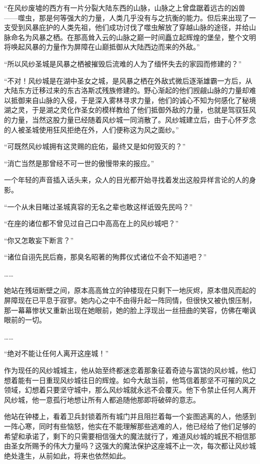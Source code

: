 \clearpage
{}


“在风纱废墟的西方有一片分裂大陆东西的山脉，山脉之上曾盘踞着远古的凶兽——噬虫，那是何等强大的力量，人类几乎没有与之抗衡的能力。但后来出现了一支受到风暴庇护的人类先祖，他们成功讨伐了噬虫解放了穿越山脉的途径，并给山脉命名为风暴之栖。在那高耸入云的山脉之巅一时间矗立起辉煌的堡垒，整个文明将唤起风暴的力量作为屏障在山巅抵御从大陆西边而来的外敌。”

“所以风纱圣城是风暴之栖被摧毁后流难的人为了缅怀失去的家园而修建的？”

“不对！风纱城是在湖中圣女之城，是风暴之栖在外敌式微后逐渐雄霸一方后，从大陆东方迁移过来的东古洛斯忒残族修建的。野心渐起的他们觊觎山脉的力量却难以抵御来自山脉的入侵，于是深入雾林寻求力量，他们的诚心不知为何感化了秘境湖之灵，于是湖之灵化作圣女的模样教给了他们抵御外敌的力量，也就是驾驭狂风的力量，当然这股力量已经随着风纱城一同消散了。风纱城建立后，由于心怀歹念的人被圣城使用狂风拒绝在外，人们便称这为风之面纱。”

“可既然风纱城拥有这灵赐的庇佑，最终又是如何毁灭的？”

“消亡当然是那曾经不可一世的傲慢带来的报应。”

一个年轻的声音插入话头来，众人的目光都开始寻找着发出这般异样言论的人的身影。

“一个从未目睹过圣城真容的无名之辈也敢这样诋毁先民吗？”

“在座的诸位都不曾见过自己口中高高在上的风纱城吧？”

“你又怎敢妄下断言？”

“诸位自诩先民后裔，那臭名昭著的殉葬仪式诸位不会不知道吧？”

……

她站在残垣断壁之间，原本高高耸立的钟楼现在只剩下一地灰烬，原本借风而起的屏障现在已平息于寂寥。她内心之中不由得升起一阵同情，但很快又被仇恨压制，那一幕幕惨状又重新出现在她眼前，她的脸上浮现出一丝扭曲的笑容，仿佛在嘲讽眼前的一切。

……

“绝对不能让任何人离开这座城！”

作为现任的风纱城城主，他从始至终都迷恋着那象征着奇迹与富饶的风纱城，他幻想着能有一日重现风纱城往日的辉煌。如今大敌当前，他笃信着那坚不可摧的风之领域，幻想着只要坚守城中，那么风纱城就永远不会覆灭。他下令禁止任何人离开风纱城，他一意孤行地想让所有人都追随他那即将破碎的意志。

他站在钟楼上，看着卫兵封锁着所有城门并且阻拦着每一个妄图逃离的人，他感到一阵心寒，同时有些恼怒，他实在不能理解那些逃难的人，他已经给了他们足够的希望和承诺了，剩下的只需要相信强大的魔法就行了，难道风纱城的城民不相信那由圣女所赐予的伟大力量吗？这强大的魔法保护这座城不止一次，每次都让风纱城绝处逢生，从前如此，将来也依然如此。

